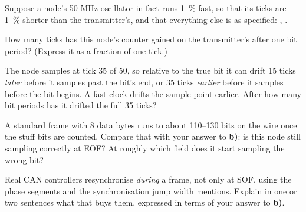 Suppose a node's 50 MHz oscillator in fact runs 1~\% fast, so that its ticks are 1~\% shorter than
the transmitter's, and that everything else is as specified: ,
.

 How many ticks has this node's counter gained on the transmitter's after one bit period?
(Express it as a fraction of one tick.)

 The node samples at tick 35 of 50, so relative to the true bit it can drift 15 ticks
\emph{later} before it samples past the bit's end, or 35 ticks \emph{earlier} before it samples
before the bit begins. A fast clock drifts the sample point earlier. After how many bit periods has
it drifted the full 35 ticks?

 A standard frame with 8 data bytes runs to about 110--130 bits on the wire once the stuff
bits are counted. Compare that with your answer to \textbf{b)}: is this node still sampling correctly
at EOF? At roughly which field does it start sampling the wrong bit?

 Real CAN controllers resynchronise \emph{during} a frame, not only at SOF, using the phase
segments and the synchronisation jump width  mentions. Explain in one or
two sentences what that buys them, expressed in terms of your answer to \textbf{b)}.
